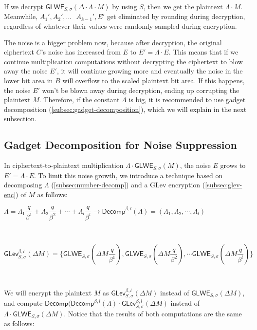 If we decrypt $\textsf{GLWE}_{S, \sigma}(\Delta \cdot \Lambda \cdot M)$ by using $S$, then we get the plaintext $\Lambda \cdot M$. Meanwhile, $A_1', A_2', ... \text{ } A_{k-1}', E'$ get eliminated by rounding during decryption, regardless of whatever their values were randomly sampled during encryption. 

The noise is a bigger problem now, because after decryption, the original ciphertext $C$'s noise has increased from $E$ to $E' = \Lambda \cdot E$. This means that if we continue multiplication computations without decrypting the ciphertext to blow away the noise $E'$, it will continue growing more and eventually the noise in the lower bit area in $B$ will overflow to the scaled plaintext bit area. If this happens, the noise $E'$ won't be blown away during decryption, ending up corrupting the plaintext $M$. Therefore, if the constant $\Lambda$ is big, it is recommended to use gadget decomposition (\autoref{subsec:gadget-decomposition}), which we will explain in the next subsection. 

\subsection{Gadget Decomposition for Noise Suppression}
\label{subsubsec:gadget-decomposition-noise-suppression}

In ciphertext-to-plaintext multiplication $\Lambda \cdot \textsf{GLWE}_{S, \sigma}(M)$, the noise $E$ grows to $E' = \Lambda \cdot E$. To limit this noise growth, we introduce a technique based on decomposing $\Lambda$ (\autoref{subsec:number-decomp}) and a GLev encryption (\autoref{subsec:glev-enc}) of $M$ as follows:


$\Lambda = \Lambda_1 \dfrac{q}{\beta^1} + \Lambda_2 \dfrac{q}{\beta^2} + \cdots + \Lambda_l \dfrac{q}{\beta^l} \longrightarrow \textsf{Decomp}^{\beta, l}(\Lambda) = (\Lambda_1, \Lambda_2, \cdots, \Lambda_l)$

$ $

$\textsf{GLev}_{S, \sigma}^{\beta, l}(\Delta M) = \Bigg\{ \textsf{GLWE}_{S, \sigma}\left(\Delta M \dfrac{q}{\beta^1}\right), \textsf{GLWE}_{S, \sigma}\left(\Delta M \dfrac{q}{\beta^2}\right), \cdots \textsf{GLWE}_{S, \sigma}\left(\Delta M \dfrac{q}{\beta^l}\right) \Bigg\}$

$ $


We will encrypt the plaintext $M$ as $\textsf{GLev}_{S, \sigma}^{\beta, l}(\Delta M)$ instead of $\textsf{GLWE}_{S, \sigma}(\Delta M)$, and compute $\textsf{Decomp}(\textsf{Decomp}^{\beta, l}(\Lambda) \cdot \textsf{GLev}_{S, \sigma}^{\beta, l}(\Delta M)$ instead of $\Lambda \cdot \textsf{GLWE}_{S, \sigma}(\Delta M)$. Notice that the results of both computations are the same as follows:

